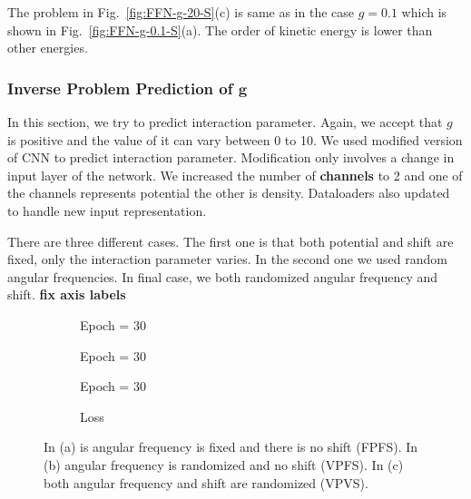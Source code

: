 \documentclass[a4paper,times,12pt]{article}
\begin{document}
The problem in Fig.~\ref{fig:FFN-g-20-S}(c) is same as in the case $g = 0.1$ which is shown in Fig.~\ref{fig:FFN-g-0.1-S}(a). The order of kinetic energy is  lower than other energies. 

\subsubsection{Inverse Problem Prediction of $\boldsymbol{g}$}

In this section, we try to predict interaction parameter. Again, we accept that $g$ is positive and the value of it can vary between 0 to 10. We used modified version of CNN to predict interaction parameter. Modification only involves a change in input layer of the network. We increased the number of \textbf{channels} to 2 and one of the channels represents potential the other is density. Dataloaders also updated to handle new input representation. 

There are three different cases. The first one is that both potential and shift are fixed, only the interaction parameter varies. In the second one we used random angular frequencies. In final case, we both randomized angular frequency and shift. \textbf{fix axis labels}


\begin{figure}[H]
    \centering
    \begin{subfigure}[t]{0.45\textwidth}
		\centering
    	
    	\caption{Epoch = 30}
		\label{fig:a}
    \end{subfigure}
    \begin{subfigure}[t]{0.45\textwidth}
        \centering
    	
    	\caption{Epoch = 30}
		\label{fig:b}
    \end{subfigure}
    \begin{subfigure}[t]{0.45\textwidth}
        \centering
		
    	\caption{Epoch = 30}
		\label{fig:c}
    \end{subfigure}
    \begin{subfigure}[t]{0.45\textwidth}
        \centering
		
    	\caption{Loss}
		\label{fig:d}
    \end{subfigure}

	\caption{In (a) is angular frequency is fixed and there is no shift (FPFS). In (b) angular frequency is randomized and no shift (VPFS). In (c) both angular frequency and shift are randomized (VPVS).}
\label{fig:FFN-g-pred}
\end{figure}
\end{document}
